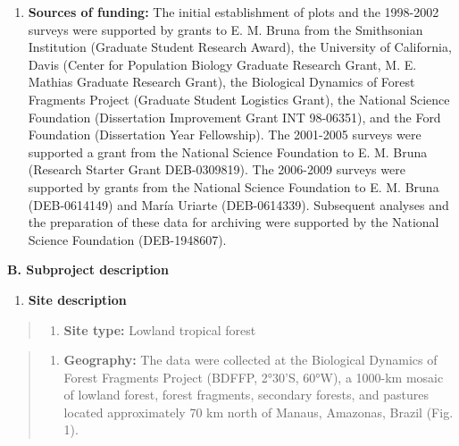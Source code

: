 \documentclass[
  man, donotrepeattitle,floatsintext]{apa6}
\providecommand{\tightlist}{%
  \setlength{\itemsep}{0pt}\setlength{\parskip}{0pt}}
\begin{document}
\begin{enumerate}
\item
  \textbf{Sources of funding:} The initial establishment of plots and the 1998-2002 surveys were supported by grants to E. M. Bruna from the Smithsonian Institution (Graduate Student Research Award), the University of California, Davis (Center for Population Biology Graduate Research Grant, M. E. Mathias Graduate Research Grant), the Biological Dynamics of Forest Fragments Project (Graduate Student Logistics Grant), the National Science Foundation (Dissertation Improvement Grant INT 98-06351), and the Ford Foundation (Dissertation Year Fellowship). The 2001-2005 surveys were supported a grant from the National Science Foundation to E. M. Bruna (Research Starter Grant DEB-0309819). The 2006-2009 surveys were supported by grants from the National Science Foundation to E. M. Bruna (DEB-0614149) and María Uriarte (DEB-0614339). Subsequent analyses and the preparation of these data for archiving were supported by the National Science Foundation (DEB-1948607).
\end{enumerate}

\noindent  
\textbf{B. Subproject description}

\begin{enumerate}
\def\labelenumi{\arabic{enumi}.}
\tightlist
\item
  \textbf{Site description}
\end{enumerate}

\begin{quote}
\begin{enumerate}
\def\labelenumi{\alph{enumi}.}
\tightlist
\item
  \textbf{Site type:} Lowland tropical forest
\end{enumerate}
\end{quote}

\begin{quote}
\begin{enumerate}
\def\labelenumi{\alph{enumi}.}
\setcounter{enumi}{1}
\tightlist
\item
  \textbf{Geography:} The data were collected at the Biological Dynamics of Forest Fragments Project (BDFFP, 2°30'S, 60°W), a 1000-km mosaic of lowland forest, forest fragments, secondary forests, and pastures located approximately 70 km north of Manaus, Amazonas, Brazil (Fig. 1).
\end{enumerate}
\end{quote}
\end{document}
